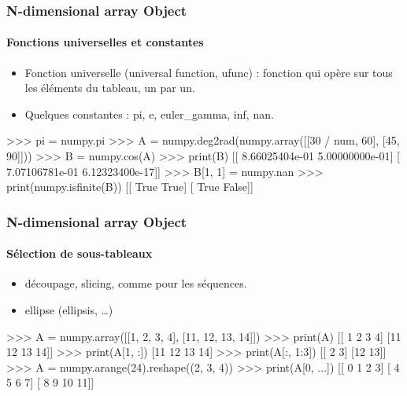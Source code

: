 \begin{frame}[fragile]
\frametitle{N-dimensional array Object}
\framesubtitle{Fonctions universelles et constantes}
\begin{itemize}
 \item Fonction universelle (universal function, ufunc) : fonction qui opère sur tous les éléments du tableau, un par un. 
 \item Quelques constantes : pi, e, euler\_gamma, inf, nan.
\end{itemize}
\begin{pythonConsole}

>>> pi = numpy.pi
>>> A = numpy.deg2rad(numpy.array([[30 / num, 60], [45, 90]]))
>>> B = numpy.cos(A)
>>> print(B)
[[  8.66025404e-01   5.00000000e-01]
 [  7.07106781e-01   6.12323400e-17]]
>>> B[1, 1] = numpy.nan
>>> print(numpy.isfinite(B))
[[ True  True]
 [ True False]]
\end{pythonConsole}
\end{frame}
\begin{frame}[fragile]
\frametitle{N-dimensional array Object}
\framesubtitle{Sélection de sous-tableaux}
\begin{itemize}
 \item découpage, slicing, comme pour les séquences.
 \item ellipse (ellipsis, \dots)
\end{itemize}
\begin{pythonConsole}
>>> A = numpy.array([[1, 2, 3, 4], [11, 12, 13, 14]])
>>> print(A)
[[ 1  2  3  4]
 [11 12 13 14]]
>>> print(A[1, :])
[11 12 13 14]
>>> print(A[:, 1:3])
[[ 2  3]
 [12 13]]
>>> A = numpy.arange(24).reshape((2, 3, 4))
>>> print(A[0, ...])
[[ 0  1  2  3]
 [ 4  5  6  7]
 [ 8  9 10 11]]
\end{pythonConsole}
\end{frame}
